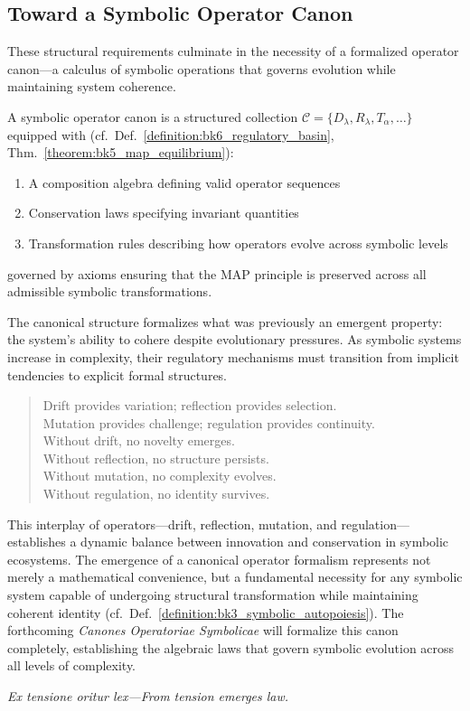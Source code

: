 \subsection{Toward a Symbolic Operator Canon}
\label{subsec:bk6_toward_a_symbolic_operator_canon}
These structural requirements culminate in the necessity of a formalized operator canon—a calculus of symbolic operations that governs evolution while maintaining system coherence.
\begin{definition}
\label{definition:bk6_symbolic_operator_canon}
A symbolic operator canon is a structured collection $\mathcal{C} = \{D_{\lambda}, R_{\lambda}, T_{\alpha}, \ldots\}$ equipped with (cf.~Def.~\ref{definition:bk6_regulatory_basin}, Thm.~\ref{theorem:bk5_map_equilibrium}):
\begin{enumerate}
\item A composition algebra defining valid operator sequences
\item Conservation laws specifying invariant quantities
\item Transformation rules describing how operators evolve across symbolic levels
\end{enumerate}
governed by axioms ensuring that the MAP principle is preserved across all admissible symbolic transformations.
\end{definition}
The canonical structure formalizes what was previously an emergent property: the system's ability to cohere despite evolutionary pressures. As symbolic systems increase in complexity, their regulatory mechanisms must transition from implicit tendencies to explicit formal structures.
\begin{quote}
Drift provides variation; reflection provides selection.\\
Mutation provides challenge; regulation provides continuity.\\
Without drift, no novelty emerges.\\
Without reflection, no structure persists.\\
Without mutation, no complexity evolves.\\
Without regulation, no identity survives.
\end{quote}
This interplay of operators—drift, reflection, mutation, and regulation—establishes a dynamic balance between innovation and conservation in symbolic ecosystems. The emergence of a canonical operator formalism represents not merely a mathematical convenience, but a fundamental necessity for any symbolic system capable of undergoing structural transformation while maintaining coherent identity (cf.~Def.~\ref{definition:bk3_symbolic_autopoiesis}).
The forthcoming \emph{Canones Operatoriae Symbolicae} will formalize this canon completely, establishing the algebraic laws that govern symbolic evolution across all levels of complexity.
\begin{flushright}
\textit{Ex tensione oritur lex—From tension emerges law.}
\end{flushright}
